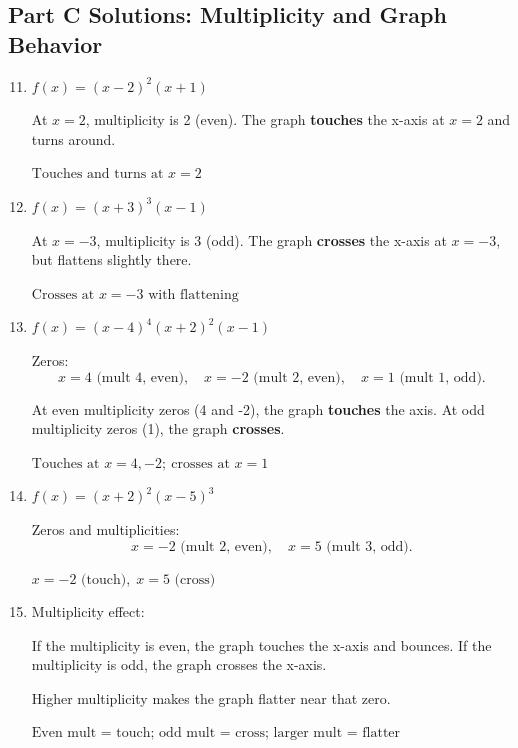\documentclass[14pt]{extarticle}
\begin{document}
\subsection*{Part C Solutions: Multiplicity and Graph Behavior}
\begin{enumerate}
  \setcounter{enumi}{10}
  \item \(f(x) = (x - 2)^2(x + 1)\)

  At \(x = 2\), multiplicity is 2 (even).  
  The graph \textbf{touches} the x-axis at \(x = 2\) and turns around.

  \(\boxed{\text{Touches and turns at } x = 2}\)

  \item \(f(x) = (x + 3)^3(x - 1)\)

  At \(x = -3\), multiplicity is 3 (odd).  
  The graph \textbf{crosses} the x-axis at \(x = -3\), but flattens slightly there.

  \(\boxed{\text{Crosses at } x = -3 \text{ with flattening}}\)

  \item \(f(x) = (x - 4)^4(x + 2)^2(x - 1)\)

  Zeros:
  \[
  x = 4 \text{ (mult 4, even)},\quad
  x = -2 \text{ (mult 2, even)},\quad
  x = 1 \text{ (mult 1, odd)}.
  \]

  At even multiplicity zeros (4 and -2), the graph \textbf{touches} the axis.  
  At odd multiplicity zeros (1), the graph \textbf{crosses}.

  \(\boxed{\text{Touches at } x = 4, -2;\ \text{crosses at } x = 1}\)

  \item \(f(x) = (x + 2)^2(x - 5)^3\)

  Zeros and multiplicities:
  \[
  x = -2 \text{ (mult 2, even)},\quad
  x = 5 \text{ (mult 3, odd)}.
  \]

  \(\boxed{x = -2 \text{ (touch)},\; x = 5 \text{ (cross)}}\)

  \item Multiplicity effect:

  If the multiplicity is even, the graph touches the x-axis and bounces.  
  If the multiplicity is odd, the graph crosses the x-axis.

  Higher multiplicity makes the graph flatter near that zero.

  \(\boxed{\text{Even mult = touch; odd mult = cross; larger mult = flatter}}\)
\end{enumerate}
\end{document}
